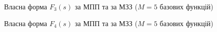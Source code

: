 \documentclass{mathreport}
\begin{document}
\begin{figure}[H]\centering
    \resizebox{\linewidth}{!}{}
    \caption{Власна форма $F_3(s)$ за МПП та за МЗЗ ($M=5$ базових функцій)}
    \label{pic: WRM (5) F3(s) eigenvector}
\end{figure}

\begin{figure}[H]\centering
    \resizebox{\linewidth}{!}{}
    \caption{Власна форма $F_4(s)$ за МПП та за МЗЗ ($M=5$ базових функцій)}
    \label{pic: WRM (5) F4(s) eigenvector}
\end{figure}


























\end{document}

